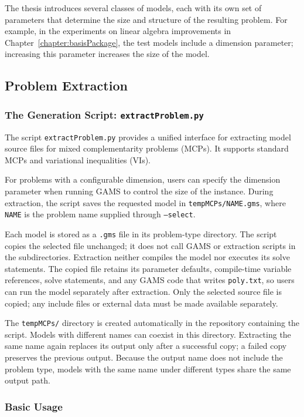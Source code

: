 The thesis introduces several classes of models, each with its own set of parameters that determine the size and structure of the resulting problem. For example, in the experiments on linear algebra improvements in Chapter~\ref{chapter:basisPackage}, the test models include a dimension parameter; increasing this parameter increases the size of the model. 

\subsection{Problem Extraction}

\subsubsection{The Generation Script: \texttt{extractProblem.py}}

The script \texttt{extractProblem.py} provides a unified interface for extracting model source files for mixed complementarity problems (MCPs). It supports standard MCPs and variational inequalities (VIs).

For problems with a configurable dimension, users can specify the dimension parameter when running GAMS to control the size of the instance. During extraction, the script saves the requested model in \texttt{tempMCPs/NAME.gms}, where \texttt{NAME} is the problem name supplied through \texttt{--select}.

Each model is stored as a \texttt{.gms} file in its problem-type directory. The script copies the selected file unchanged; it does not call GAMS or extraction scripts in the subdirectories. Extraction neither compiles the model nor executes its solve statements. The copied file retains its parameter defaults, compile-time variable references, solve statements, and any GAMS code that writes \texttt{poly.txt}, so users can run the model separately after extraction. Only the selected source file is copied; any include files or external data must be made available separately.

The \texttt{tempMCPs/} directory is created automatically in the repository containing the script. Models with different names can coexist in this directory. Extracting the same name again replaces its output only after a successful copy; a failed copy preserves the previous output. Because the output name does not include the problem type, models with the same name under different types share the same output path.

\subsubsection{Basic Usage}


